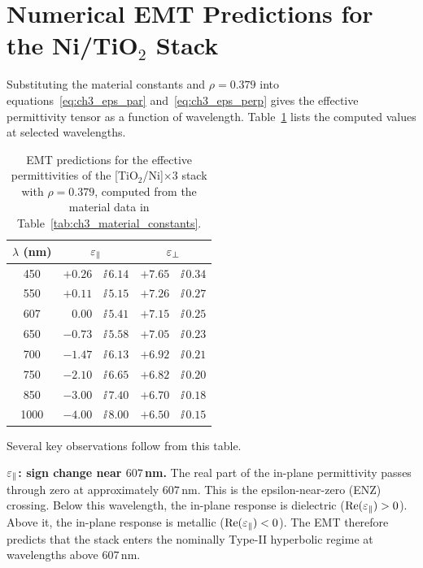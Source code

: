 \section{Numerical EMT Predictions for the Ni/TiO\texorpdfstring{$_2$}{2} Stack}

Substituting the material constants and $\rho = 0.379$ into
equations~\eqref{eq:ch3_eps_par} and~\eqref{eq:ch3_eps_perp} gives the
effective permittivity tensor as a function of wavelength.
Table~\ref{tab:ch3_emt_results} lists the computed values at selected
wavelengths.

\begin{table}[h]
\centering
\caption{EMT predictions for the effective permittivities of the
  [TiO$_2$/Ni]$\times$3 stack with $\rho = 0.379$, computed from the
  material data in Table~\ref{tab:ch3_material_constants}.}
\label{tab:ch3_emt_results}
\begin{tabular}{c r@{$\,+\,$}l r@{$\,+\,$}l}
\toprule
$\lambda$ (nm)
  & \multicolumn{2}{c}{$\varepsilon_{\parallel}$}
  & \multicolumn{2}{c}{$\varepsilon_{\perp}$} \\
\midrule
450  & $+0.26$  & $\ii\,6.14$  & $+7.65$ & $\ii\,0.34$ \\
550  & $+0.11$  & $\ii\,5.15$  & $+7.26$ & $\ii\,0.27$ \\
607  & $\,0.00$ & $\ii\,5.41$  & $+7.15$ & $\ii\,0.25$ \\
650  & $-0.73$  & $\ii\,5.58$  & $+7.05$ & $\ii\,0.23$ \\
700  & $-1.47$  & $\ii\,6.13$  & $+6.92$ & $\ii\,0.21$ \\
750  & $-2.10$  & $\ii\,6.65$  & $+6.82$ & $\ii\,0.20$ \\
850  & $-3.00$  & $\ii\,7.40$  & $+6.70$ & $\ii\,0.18$ \\
1000 & $-4.00$  & $\ii\,8.00$  & $+6.50$ & $\ii\,0.15$ \\
\bottomrule
\end{tabular}
\end{table}

Several key observations follow from this table.

\textbf{$\varepsilon_{\parallel}$: sign change near $607$\,nm.} The real part of the in-plane
permittivity passes through zero at approximately $607$\,nm. This is the
epsilon-near-zero (ENZ) crossing. Below this wavelength, the in-plane response
is dielectric ($\operatorname{Re}(\varepsilon_{\parallel}) > 0$). Above it, the in-plane response is metallic
($\operatorname{Re}(\varepsilon_{\parallel}) < 0$). The EMT therefore predicts that the stack enters the
nominally Type-II hyperbolic regime at wavelengths above $607$\,nm.

